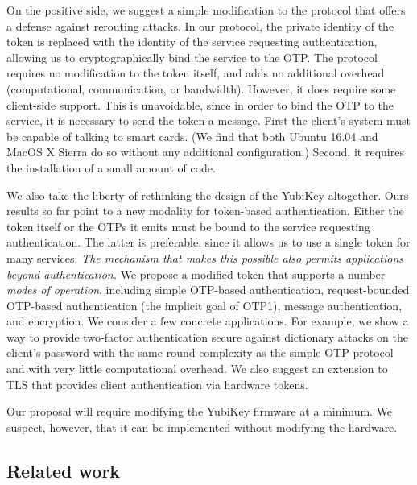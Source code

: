 On the positive side, we suggest a simple modification to the protocol that
offers a defense against rerouting attacks. In our protocol, the private
identity of the token is replaced with the identity of the service requesting
authentication, allowing us to cryptographically bind the service to the OTP.
%
The protocol requires no modification to the token itself, and adds no
additional overhead (computational, communication, or bandwidth). However, it
does require some client-side support. This is unavoidable, since in order to
bind the OTP to the service, it is necessary to send the token a message. First
the client's system must be capable of talking to smart cards. (We find that
both Ubuntu 16.04 and MacOS X Sierra do so without any additional
configuration.)  Second, it requires the
installation of a small amount of code.

We also take the liberty of rethinking the design of the YubiKey altogether.
Ours results so far point to a new modality for token-based authentication.
Either the token itself or the OTPs it emits must be bound to the service
requesting authentication. The latter is preferable, since it allows us to use a
single token for many services.
%
\emph{The mechanism that makes this possible also permits applications beyond
authentication.}
%
We propose a modified token that supports a number \emph{modes of operation},
including simple OTP-based authentication, request-bounded OTP-based
authentication (the implicit goal of OTP1), message authentication, and
encryption.
%
We consider a few concrete applications. For example, we show a way to provide
two-factor authentication secure against dictionary attacks on the client's
password with the same round complexity as the simple OTP protocol and with very
little computational overhead. We also suggest an extension to TLS that provides
client authentication via hardware tokens.

Our proposal will require modifying the YubiKey firmware at a minimum. We
suspect, however, that it can be implemented without modifying the hardware.



\subsection{Related work}

